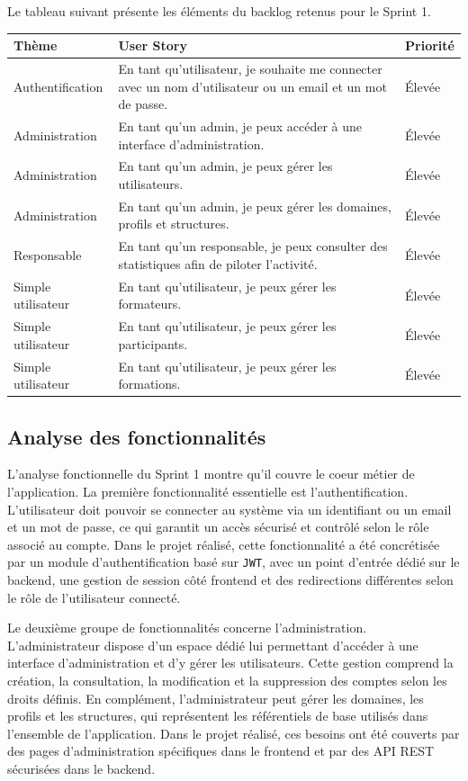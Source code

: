 \documentclass[12pt,a4paper]{report}
\begin{document}
Le tableau suivant présente les éléments du backlog retenus pour le Sprint 1.

\begin{longtable}{|>{\raggedright\arraybackslash}p{3.2cm}|>{\raggedright\arraybackslash}p{8.8cm}|>{\centering\arraybackslash}p{2.2cm}|}
\hline
\textbf{Thème} & \textbf{User Story} & \textbf{Priorité} \\
\hline
Authentification & En tant qu'utilisateur, je souhaite me connecter avec un nom d'utilisateur ou un email et un mot de passe. & Élevée \\
\hline
Administration & En tant qu'un admin, je peux accéder à une interface d'administration. & Élevée \\
\hline
Administration & En tant qu'un admin, je peux gérer les utilisateurs. & Élevée \\
\hline
Administration & En tant qu'un admin, je peux gérer les domaines, profils et structures. & Élevée \\
\hline
Responsable & En tant qu'un responsable, je peux consulter des statistiques afin de piloter l'activité. & Élevée \\
\hline
Simple utilisateur & En tant qu'utilisateur, je peux gérer les formateurs. & Élevée \\
\hline
Simple utilisateur & En tant qu'utilisateur, je peux gérer les participants. & Élevée \\
\hline
Simple utilisateur & En tant qu'utilisateur, je peux gérer les formations. & Élevée \\
\hline
\end{longtable}

\subsection{Analyse des fonctionnalités}
L'analyse fonctionnelle du Sprint 1 montre qu'il couvre le coeur métier de l'application. La première fonctionnalité essentielle est l'authentification. L'utilisateur doit pouvoir se connecter au système via un identifiant ou un email et un mot de passe, ce qui garantit un accès sécurisé et contrôlé selon le rôle associé au compte. Dans le projet réalisé, cette fonctionnalité a été concrétisée par un module d'authentification basé sur \texttt{JWT}, avec un point d'entrée dédié sur le backend, une gestion de session côté frontend et des redirections différentes selon le rôle de l'utilisateur connecté.

Le deuxième groupe de fonctionnalités concerne l'administration. L'administrateur dispose d'un espace dédié lui permettant d'accéder à une interface d'administration et d'y gérer les utilisateurs. Cette gestion comprend la création, la consultation, la modification et la suppression des comptes selon les droits définis. En complément, l'administrateur peut gérer les domaines, les profils et les structures, qui représentent les référentiels de base utilisés dans l'ensemble de l'application. Dans le projet réalisé, ces besoins ont été couverts par des pages d'administration spécifiques dans le frontend et par des API REST sécurisées dans le backend.
\end{document}
